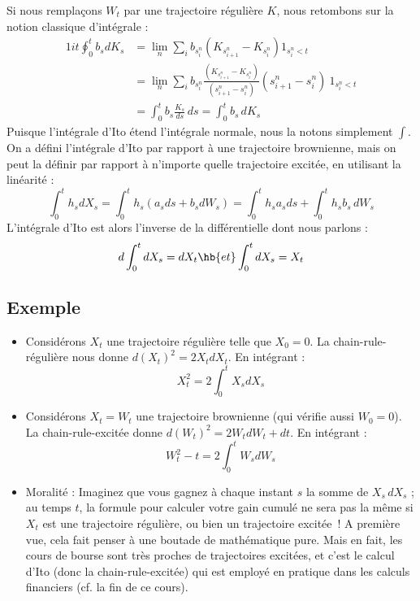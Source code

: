 \documentclass{article}
\begin{document}
Si nous remplaçons $W_t$ par une trajectoire régulière $K$, nous retombons sur la notion classique d'intégrale :
\begin{alignat*}{1}
it \!\!\oint_0^t b_s dK_s  & = \lim_n  \sum_{i}   b_{s^n_{i}} ( K_{s^n_{i+1}} - K_{s^n_i} )    1_{s^n_i<t}  \\
& = \lim_n  \sum_{i}   b_{s^n_{i}} \frac {( K_{s^n_{i+1}} - K_{s^n_i} ) }{(s^n_{i+1} - s^n_i) }   (s^n_{i+1} - s^n_i) \ 1_{s^n_i<t}  \\
&= \int_0^t b_s \frac {K_s}{ds}\, ds = \int_0^t b_s \, dK_s 
\end{alignat*}
Puisque l'intégrale d'Ito étend l'intégrale normale, nous la notons simplement $\int$.  On a défini l'intégrale d'Ito par rapport à une trajectoire brownienne, mais on peut la définir par rapport à n'importe quelle trajectoire excitée, en utilisant la linéarité : 
$$
\int_0^t h_s dX_s = \int_0^t h_s (a_s ds + b_s dW_s)= \int_0^t h_s a_s ds + \int_0^t h_s b_s  \, dW_s
$$
L'intégrale d'Ito est alors l'inverse de la différentielle dont nous parlons : 
$$
d \int_0^t  dX_s=  dX_t       \hb{ et }    \int_0^t dX_s = X_t
$$


\subsection{Exemple}

\begin{itemize}
\item Considérons $X_t$ une trajectoire régulière telle que $X_0=0$. La chain-rule-régulière nous donne   
$d (X_t)^2= 2X_t dX_t$. En intégrant : 
$$
X^2_t =2 \int_0^t X_s dX_s  
$$
\item Considérons $X_t = W_t$ une trajectoire brownienne (qui vérifie aussi $W_0=0$). La chain-rule-excitée donne   $d (W_t)^2 = 2W_t dW_t + dt$.  En intégrant :
$$
W_t^2 - t  =2 \int_0^t W_s dW_s
$$
\item Moralité :  Imaginez que vous gagnez à chaque instant $s$ la somme de $X_s\, dX_s$ ; au temps $t$, la formule pour calculer votre gain cumulé ne sera pas la même si $X_t$ est une trajectoire régulière, ou bien un trajectoire excitée~!   A première vue, cela fait penser à une boutade de mathématique pure.   Mais en fait, les cours de bourse sont très proches de trajectoires excitées, et c'est le calcul d'Ito (donc la chain-rule-excitée)   qui est employé  en pratique dans les calculs financiers (cf. la fin de ce cours).  
\end{itemize}
\end{document}
